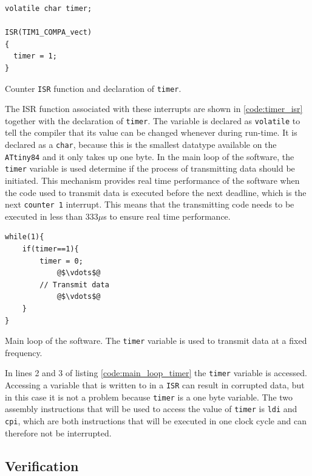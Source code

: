 {\begin{listing}[h] 
\begin{verbatim}
volatile char timer;

ISR(TIM1_COMPA_vect)
{ 
  timer = 1;
}
\end{verbatim}
\caption{Counter \texttt{ISR} function and declaration of \texttt{timer}.}
\label{code:timer_isr}
\end{listing}

The ISR function associated with these interrupts are shown in \ref{code:timer_isr} together with the declaration of \texttt{timer}.
The variable is declared as \texttt{volatile} to tell the compiler that its value can be changed whenever during run-time. 
It is declared as a \texttt{char}, because this is the smallest datatype available on the \texttt{ATtiny84} and it only takes up one byte. 
In the main loop of the software, the \texttt{timer} variable is used determine if the process of transmitting data should be initiated.
This mechanism provides real time performance of the software when the code used to transmit data is executed before the next deadline, which is the next \texttt{counter 1} interrupt.
This means that the transmitting code needs to be executed in less than 333$\mu$s to ensure real time performance.

\begin{listing}[h] 
\begin{verbatim}
while(1){
    if(timer==1){ 
      	timer = 0;
      		@$\vdots$@
      	// Transmit data
			@$\vdots$@      
	}
}
\end{verbatim}
\caption{Main loop of the software. The \texttt{timer} variable is used to transmit data at a fixed frequency.} 
\label{code:main_loop_timer}
\end{listing}
In lines 2 and 3 of listing \ref{code:main_loop_timer} the \texttt{timer} variable is accessed.  
Accessing a variable that is written to in a \texttt{ISR} can result in corrupted data, but in this case it is not a problem because \texttt{timer} is a one byte variable. 
The two assembly instructions that will be used to access the value of \texttt{timer} is \texttt{ldi} and \texttt{cpi}, which are both instructions that will be executed in one clock cycle and can therefore not be interrupted.

\subsection{Verification} %
\label{sub:verification}


}
